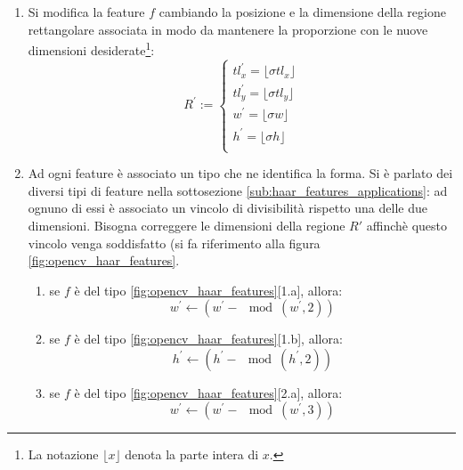 \begin{enumerate}
\begin{enumerate}
                \item Si modifica la feature $f$ cambiando la posizione e la dimensione della regione rettangolare associata in modo da mantenere la proporzione con le nuove dimensioni desiderate\footnote{La notazione $\lfloor x \rfloor$ denota la parte intera di $x$.}:
                \begin{equation}
                    \label{subeq:resize}
                    R^{'} :=
                    \begin{cases}
                        tl^{'}_x = \lfloor \sigma tl_x \rfloor \\ 
                        tl^{'}_y = \lfloor \sigma tl_y \rfloor \\
                        w^{'} = \lfloor \sigma w \rfloor \\
                        h^{'} = \lfloor \sigma h \rfloor \\
                    \end{cases}
                \end{equation}

                \item Ad ogni feature è associato un tipo che ne identifica la forma.
                Si è parlato dei diversi tipi di feature nella sottosezione \ref{sub:haar_features_applications}: ad ognuno di essi è associato un vincolo di divisibilità rispetto una delle due dimensioni.
                Bisogna correggere le dimensioni della regione $R'$ affinchè questo vincolo venga soddisfatto (si fa riferimento alla figura \ref{fig:opencv_haar_features}.
                \begin{enumerate}
                    \item se $f$ è del tipo \ref{fig:opencv_haar_features}[1.a], allora:
                    \begin{equation}
                        w^{'} \leftarrow (w^{'} - \mod(w^{'}, 2))
                    \end{equation}

                    \item se $f$ è del tipo \ref{fig:opencv_haar_features}[1.b], allora:
                    \begin{equation}
                        h^{'} \leftarrow (h^{'} - \mod(h^{'}, 2))
                    \end{equation}

                    \item se $f$ è del tipo \ref{fig:opencv_haar_features}[2.a], allora:
                    \begin{equation}
                        w^{'} \leftarrow (w^{'} - \mod(w^{'}, 3))
                    \end{equation}


\end{enumerate}
\end{enumerate}
\end{enumerate}
